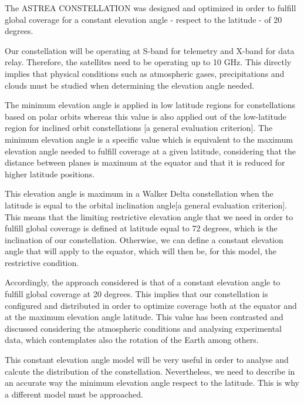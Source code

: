 The ASTREA CONSTELLATION was designed and optimized in order to fulfill global coverage for a constant elevation angle - respect to the latitude - of 20 degrees.

Our constellation will be operating at S-band for telemetry and X-band for data relay. Therefore, the satellites need to be operating up to 10 GHz. This directly implies that physical conditions such as atmospheric gases, precipitations and clouds must be studied when determining the elevation angle needed.

The minimum elevation angle is applied in low latitude regions for constellations based on polar orbits whereas this value is also applied out of the low-latitude region for inclined orbit constellations [a general evaluation criterion]. The minimum elevation angle is a specific value which is equivalent to the maximum elevation angle needed to fulfill coverage at a given latitude, considering that the distance between planes is maximum at the equator and that it is reduced for higher latitude positions.

This elevation angle is maximum in a Walker Delta constellation when the latitude is equal to the orbital inclination angle[a general evaluation criterion]. This means that the limiting restrictive elevation angle that we need in order to fulfill global coverage is defined at latitude equal to 72 degrees, which is the inclination of our constellation. Otherwise, we can define a constant elevation angle that will apply to the equator, which will then be, for this model, the restrictive condition.

Accordingly, the approach considered is that of a constant elevation angle to fulfill global coverage at 20 degrees. This implies that our constellation is configured and distributed in order to optimize coverage both at the equator and at the maximum elevation angle latitude. This value has been contrasted and discussed considering the atmospheric conditions and analysing experimental data, which contemplates also the rotation of the Earth among others.

This constant elevation angle model will be very useful in order to analyse and calcute the distribution of the constellation. Nevertheless, we need to describe in an accurate way the minimum elevation angle respect to the latitude. This is why a different model must be approached.

